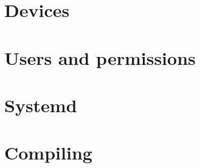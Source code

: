 \documentclass[oneside]{book}
\begin{document}
\part{Devices}




\part{Users and permissions}
%
%







\part{Systemd}

\part{Compiling}

\end{document}
